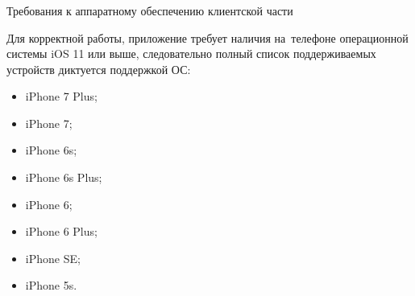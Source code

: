 \subsubsection{} Требования к аппаратному обеспечению клиентской части
\label{sec:analysis:research:req:client_requirments}

Для корректной работы, приложение требует наличия на~телефоне операционной системы iOS 11 или выше, следовательно полный список поддерживаемых устройств диктуется поддержкой ОС:
\begin{itemize}
	\item iPhone 7 Plus;
	\item iPhone 7;
	\item iPhone 6s;
	\item iPhone 6s Plus;
	\item iPhone 6;
	\item iPhone 6 Plus;
	\item iPhone SE;
	\item iPhone 5s.
\end{itemize}